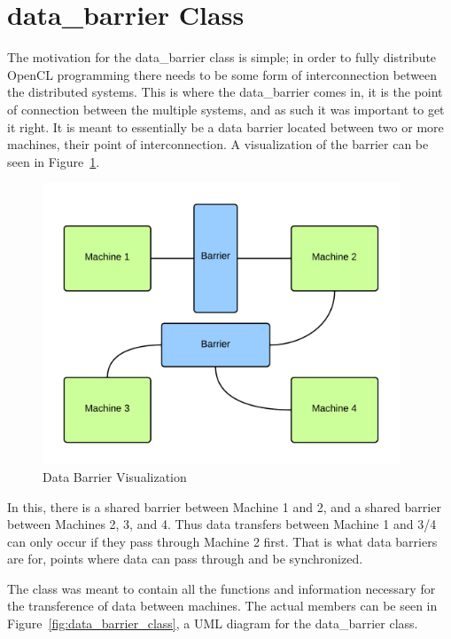 \documentclass[../thesis.tex]{subfiles}
\begin{document}
\section{data\_barrier Class} %

The motivation for the data\_barrier class is simple; in order to fully distribute OpenCL programming there needs to be some form of interconnection between the distributed systems. This is where the data\_barrier comes in, it is the point of connection between the multiple systems, and as such it was important to get it right. It is meant to essentially be a data barrier located between two or more machines, their point of interconnection. A visualization of the barrier can be seen in Figure~\ref{fig:data_barrier_vis}.

\begin{figure}[htbp]
  \centering
  \includegraphics[width=0.95\textwidth]{diagrams/data_barrier_visual.png}
  \caption{Data Barrier Visualization}
  \label{fig:data_barrier_vis}
\end{figure}

In this, there is a shared barrier between Machine 1 and 2, and a shared barrier between Machines 2, 3, and 4. Thus data transfers between Machine 1 and 3/4 can only occur if they pass through Machine 2 first. That is what data barriers are for, points where data can pass through and be synchronized.

The class was meant to contain all the functions and information necessary for the transference of data between machines. The actual members can be seen in Figure~\ref{fig:data_barrier_class}, a UML diagram for the data\_barrier class.
\end{document}
